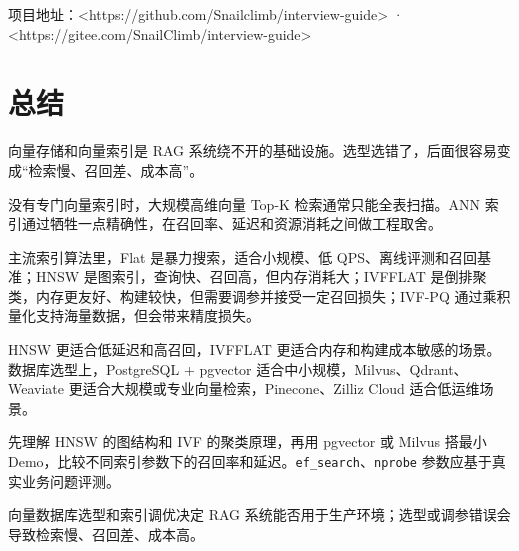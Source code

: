 \documentclass[9pt,a4paper,twocolumn]{ctexart}
\begin{document}
项目地址：<https://github.com/Snailclimb/interview-guide> · <https://gitee.com/SnailClimb/interview-guide>



\section*{总结}


向量存储和向量索引是 RAG 系统绕不开的基础设施。选型选错了，后面很容易变成“检索慢、召回差、成本高”。



没有专门向量索引时，大规模高维向量 Top-K 检索通常只能全表扫描。ANN 索引通过牺牲一点精确性，在召回率、延迟和资源消耗之间做工程取舍。



主流索引算法里，Flat 是暴力搜索，适合小规模、低 QPS、离线评测和召回基准；HNSW 是图索引，查询快、召回高，但内存消耗大；IVFFLAT 是倒排聚类，内存更友好、构建较快，但需要调参并接受一定召回损失；IVF-PQ 通过乘积量化支持海量数据，但会带来精度损失。



HNSW 更适合低延迟和高召回，IVFFLAT 更适合内存和构建成本敏感的场景。数据库选型上，PostgreSQL + pgvector 适合中小规模，Milvus、Qdrant、Weaviate 更适合大规模或专业向量检索，Pinecone、Zilliz Cloud 适合低运维场景。



先理解 HNSW 的图结构和 IVF 的聚类原理，再用 pgvector 或 Milvus 搭最小 Demo，比较不同索引参数下的召回率和延迟。\texttt{ef\_search}、\texttt{nprobe} 参数应基于真实业务问题评测。



向量数据库选型和索引调优决定 RAG 系统能否用于生产环境；选型或调参错误会导致检索慢、召回差、成本高。
\end{document}
